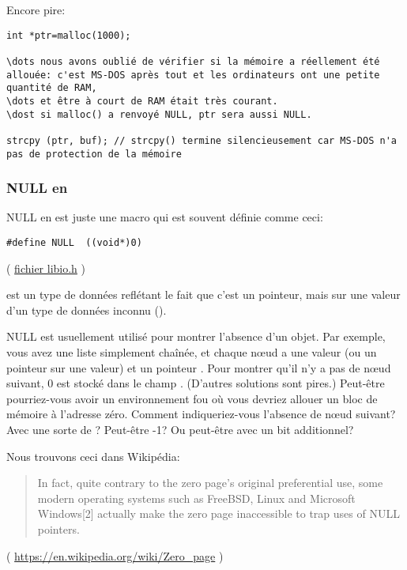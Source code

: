 Encore pire:

\begin{lstlisting}[style=customc]
int *ptr=malloc(1000);

\dots nous avons oublié de vérifier si la mémoire a réellement été allouée: c'est MS-DOS après tout et les ordinateurs ont une petite quantité de RAM,
\dots et être à court de RAM était très courant.
\dost si malloc() a renvoyé NULL, ptr sera aussi NULL.

strcpy (ptr, buf); // strcpy() termine silencieusement car MS-DOS n'a pas de protection de la mémoire
\end{lstlisting}

\subsubsection{NULL en \CCpp}

NULL en \CCpp est juste une macro qui est souvent définie comme ceci:

\begin{lstlisting}[style=customc]
#define NULL  ((void*)0)
\end{lstlisting}
( \href{https://github.com/wzhy90/linaro_toolchains/blob/8ff8ae680bac04558d10cc9626e12c4c2f6c1348/arm-cortex_a15-linux-gnueabihf/libc/usr/include/libio.h#L70}{fichier libio.h} )

 est un type de données reflétant le fait que c'est un pointeur, mais sur
une valeur d'un type de données inconnu ().

NULL est usuellement utilisé pour montrer l'absence d'un objet.
Par exemple, vous avez une liste simplement chaînée, et chaque n\oe{}ud a une valeur
(ou un pointeur sur une valeur) et un pointeur .
Pour montrer qu'il n'y a pas de n\oe{}ud suivant, 0 est stocké dans le champ .
(D'autres solutions sont pires.)
Peut-être pourriez-vous avoir un environnement fou où vous devriez allouer un bloc
de mémoire à l'adresse zéro. Comment indiqueriez-vous l'absence de n\oe{}ud suivant?
Avec une sorte de ? Peut-être -1? Ou peut-être avec un bit additionnel?

Nous trouvons ceci dans Wikipédia:

\begin{framed}
\begin{quotation}
In fact, quite contrary to the zero page's original preferential use, some modern operating systems such as FreeBSD, Linux and Microsoft Windows[2] actually make the zero page inaccessible to trap uses of NULL pointers. 
\end{quotation}
\end{framed}
( \url{https://en.wikipedia.org/wiki/Zero_page} )

